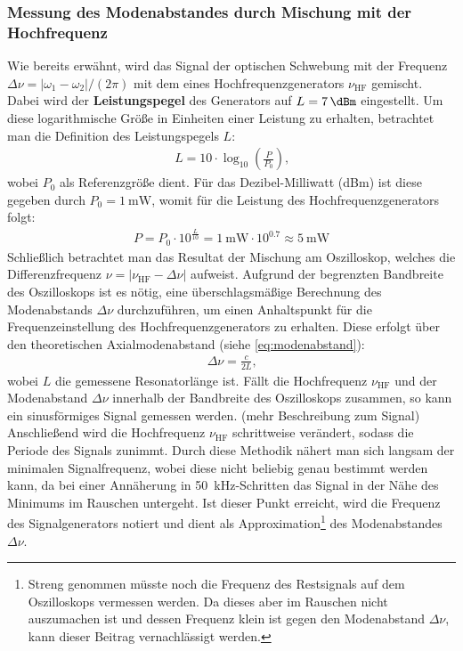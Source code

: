 \documentclass[11pt, a4paper]{article}
\numberwithin{equation}{section}
\begin{document}
\subsubsection{Messung des Modenabstandes durch Mischung mit der Hochfrequenz}
Wie bereits erwähnt, wird das Signal der optischen Schwebung mit der Frequenz $\Delta \nu = |\omega_1 - \omega_2| / (2\pi)$ mit dem eines Hochfrequenzgenerators $\nu_\mathrm{HF}$ gemischt.
Dabei wird der \textbf{Leistungspegel} des Generators auf $L = \SI{+7}{\dBm}$ eingestellt. Um diese logarithmische Größe in Einheiten einer Leistung zu erhalten, betrachtet man die Definition des Leistungspegels $L$: 
\begin{align}
	L = 10 \cdot \log_{10}\left( \frac{P}{P_0}\right) \text{,}
\end{align}
wobei $P_0$ als Referenzgröße dient.
Für das Dezibel-Milliwatt (\si{dBm}) ist diese gegeben durch $P_0 = \SI{1}{\milli\watt}$, womit für die Leistung des Hochfrequenzgenerators folgt:
\begin{align}
	P = P_0 \cdot 10^{\frac{L}{10}} = \SI{1}{\milli\watt} \cdot 10^{\num{0.7}} \approx \SI{5}{\milli\watt}
\end{align}
Schließlich betrachtet man das Resultat der Mischung am Oszilloskop, welches die Differenzfrequenz $\nu = |\nu_\mathrm{HF} - \Delta \nu|$ aufweist.
Aufgrund der begrenzten Bandbreite des Oszilloskops ist es nötig, eine überschlagsmäßige Berechnung des Modenabstands $\Delta \nu$ durchzuführen, um einen Anhaltspunkt für die Frequenzeinstellung des Hochfrequenzgenerators zu erhalten.
Diese erfolgt über den theoretischen Axialmodenabstand (siehe \eqref{eq:modenabstand}):
\begin{align}
	\Delta \nu = \frac{c}{2 L} \text{,}
\end{align}
wobei $L$ die gemessene Resonatorlänge ist.
Fällt die Hochfrequenz $\nu_\mathrm{HF}$ und der Modenabstand $\Delta \nu$ innerhalb der Bandbreite des Oszilloskops zusammen, so kann ein sinusförmiges Signal gemessen werden.
(mehr Beschreibung zum Signal)
Anschließend wird die Hochfrequenz $\nu_\mathrm{HF}$ schrittweise verändert, sodass die Periode des Signals zunimmt.
Durch diese Methodik nähert man sich langsam der minimalen Signalfrequenz, wobei diese nicht beliebig genau bestimmt werden kann, da bei einer Annäherung in \SI{50}{\kilo\hertz}-Schritten das Signal in der Nähe des Minimums im Rauschen untergeht.
Ist dieser Punkt erreicht, wird die Frequenz des Signalgenerators notiert und dient als Approximation\footnote{Streng genommen müsste noch die Frequenz des Restsignals auf dem Oszilloskops vermessen werden. Da dieses aber im Rauschen nicht auszumachen ist und dessen Frequenz klein ist gegen den Modenabstand $\Delta \nu$, kann dieser Beitrag vernachlässigt werden.} des Modenabstandes $\Delta \nu$.
\end{document}
